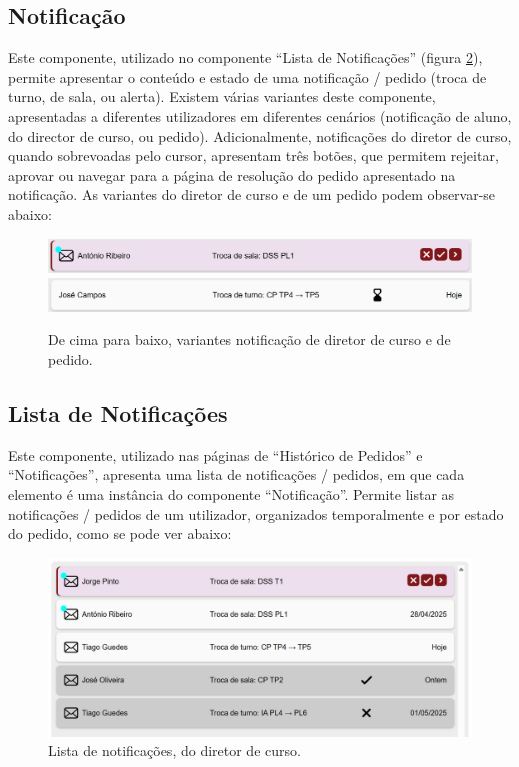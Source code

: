 \documentclass[12pt, a4paper]{article}
\begin{document}
\subsection{Notificação}

Este componente, utilizado no componente ``Lista de Notificações'' (figura
\ref{notifications-list}), permite apresentar o conteúdo e estado de uma notificação / pedido
(troca de turno, de sala, ou alerta). Existem várias variantes deste componente, apresentadas a
diferentes utilizadores em diferentes cenários (notificação de aluno, do director de curso, ou
pedido). Adicionalmente, notificações do diretor de curso, quando sobrevoadas pelo cursor,
apresentam três botões, que permitem rejeitar, aprovar ou navegar para a página de resolução do
pedido apresentado na notificação. As variantes do diretor de curso e de um pedido podem observar-se
abaixo:

\begin{figure}[H]
    \centering
    \includegraphics[width=\textwidth]{res/components/director-notification.png}
    \includegraphics[width=\textwidth]{res/components/student-request.png}
    \caption{De cima para baixo, variantes notificação de diretor de curso e de pedido.}
    \label{notification}
\end{figure}

\subsection{Lista de Notificações}

Este componente, utilizado nas páginas de ``Histórico de Pedidos'' e ``Notificações'', apresenta uma
lista de notificações / pedidos, em que cada elemento é uma instância do componente ``Notificação''.
Permite listar as notificações / pedidos de um utilizador, organizados temporalmente e por estado do
pedido, como se pode ver abaixo:

\begin{figure}[H]
    \centering
    \includegraphics[width=\textwidth]{res/components/director-notifications-list.png}
    \caption{Lista de notificações, do diretor de curso.}
    \label{notifications-list}
\end{figure}
\end{document}
